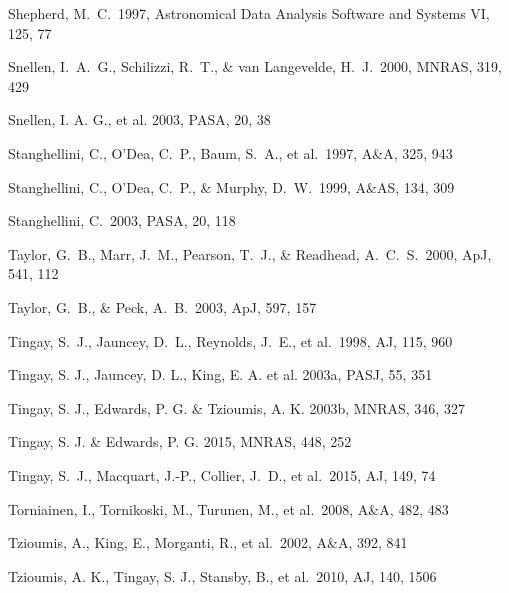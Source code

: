 \documentclass{pasa}%
\begin{document}
\begin{thebibliography}{}
Shepherd, M.~C.\ 1997, Astronomical Data Analysis Software and Systems VI, 125, 77 

Snellen, I.~A.~G., Schilizzi, R.~T., \& van Langevelde, H.~J.\ 2000, MNRAS, 319, 429 

Snellen, I. A. G., et al.  2003, PASA, 20, 38

Stanghellini, C., O'Dea, C.~P., Baum, S.~A., et al.\ 1997, A\&A, 325, 943 

Stanghellini, C., O'Dea, C.~P., \& Murphy, D.~W.\ 1999, A\&AS, 134, 309 

Stanghellini, C.\ 2003, PASA, 20, 118 

Taylor, G.~B., Marr, J.~M., Pearson, T.~J., \& Readhead, A.~C.~S.\ 2000, ApJ, 541, 112 

Taylor, G.~B., \& Peck, A.~B.\ 2003, ApJ, 597, 157 

Tingay, S.~J., Jauncey, D.~L., Reynolds, J.~E., et al.\ 1998, AJ, 115, 960

Tingay, S. J., Jauncey, D. L., King, E. A. et al. 2003a, PASJ, 55, 351

Tingay, S. J., Edwards, P. G. \& Tzioumis, A. K. 2003b, MNRAS, 346, 327

Tingay, S. J. \& Edwards, P. G. 2015, MNRAS, 448, 252

Tingay, S.~J., Macquart, J.-P., Collier, J.~D., et al.\ 2015, AJ, 149, 74 

Torniainen, I., Tornikoski, M., Turunen, M., et al.\ 2008, A\&A, 482, 483 

Tzioumis, A., King, E., Morganti, R., et al.\ 2002, A\&A, 392, 841 

Tzioumis, A. K., Tingay, S. J., Stansby, B., et al.\ 2010, AJ, 140, 1506 


\end{thebibliography}
\end{document}
